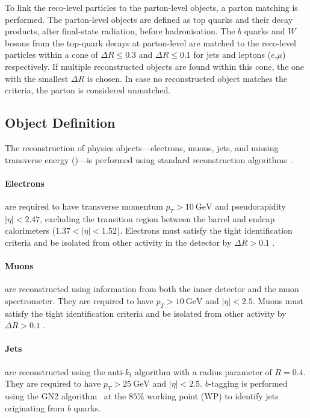 To link the reco-level particles to the parton-level objects, a parton matching is performed. The parton-level objects are defined as top quarks and their decay products, after final-state radiation, before hadronisation. The $b$ quarks and $W$ bosons from the top-quark decays at parton-level are matched to the reco-level particles within a cone of $\Delta R \leq 0.3$ and $\Delta R\leq 0.1$ for jets and leptons ($e$,$\mu$) respectively. If multiple reconstructed objects are found within this cone, the one with the smallest $\Delta R$ is chosen. In case no reconstructed object matches the criteria, the parton is considered unmatched.

\subsection{Object Definition}
\label{sec:object-definition}
The reconstruction of physics objects—electrons, muons, jets, and missing transverse energy (\met)—is performed using standard \atlas reconstruction algorithms~\cite{atlas_tdr}.

\paragraph{Electrons} are required to have transverse momentum $p_T>\qty{10}{\giga\electronvolt}$ and pseudorapidity $|\eta| < 2.47$, excluding the transition region between the barrel and endcap calorimeters ($1.37 < |\eta| < 1.52$). Electrons must satisfy the tight identification criteria and be isolated from other activity in the detector by $\Delta R>0.1$ \cite{EGAM-2018-01,EGAM-2019-01}.

\paragraph{Muons} are reconstructed using information from both the inner detector and the muon spectrometer. They are required to have $p_T>\qty{10}{\giga\electronvolt}$ and $|\eta| < 2.5$. Muons must satisfy the tight identification criteria and be isolated from other activity by $\Delta R>0.1$ \cite{muon,muon_2}.

\paragraph{Jets} are reconstructed using the anti-$k_t$ algorithm \cite{anti_k_t_jet_2} with a radius parameter of $R = 0.4$. They are required to have $p_T>\qty{25}{\giga\electronvolt}$ and $|\eta| <
2.5$. $b$-tagging is performed using the GN2
algorithm~\cite{gn2_btagger} at the $85\%$ working point (WP) to identify jets originating from $b$ quarks. 

